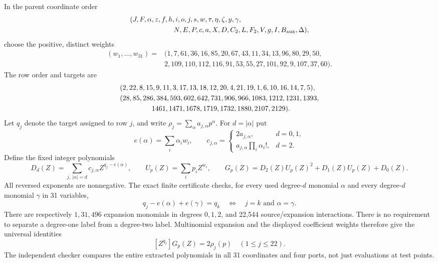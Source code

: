 In the parent coordinate order
\[
\begin{split}
 &(J,F,\alpha,z,f,h,i,o,j,s,w,\tau,\eta,\zeta,y,\gamma,\\
 &\hspace{22mm}N,E,P,c,a,X,D,C_2,L,F_2,V,g,I,B_{\rm aux},\Delta),
\end{split}
\]
choose the positive, distinct weights
\[
\begin{split}
 (w_1,\ldots,w_{31})={}&(1,7,61,36,16,85,20,67,43,11,34,13,96,80,29,50,\\
 &2,109,110,112,116,91,53,55,27,101,92,9,107,37,60).
\end{split}
\]
The row order and targets are
\[
\begin{split}
 &(2,22,8,15,9,11,3,17,13,18,12,20,4,21,19,1,6,10,16,14,7,5),\\
 &(28,85,286,384,593,602,642,731,906,966,1083,1212,1231,1393,\\
 &\hspace{16mm}1461,1471,1678,1719,1732,1880,2107,2129).
\end{split}
\]
Let $q_j$ denote the target assigned to row $j$, and write
$\rho_j=\sum_\alpha a_{j,\alpha}p^\alpha$. For $d=|\alpha|$ put
\[
 e(\alpha)=\sum_i\alpha_iw_i,\qquad
 c_{j,\alpha}=
 \begin{cases}2a_{j,\alpha},&d=0,1,\\
 a_{j,\alpha}\prod_i\alpha_i!,&d=2.
 \end{cases}
\]
Define the fixed integer polynomials
\[
 D_d(Z)=\sum_{j,\,|\alpha|=d}c_{j,\alpha}Z^{q_j-e(\alpha)},\qquad
 U_p(Z)=\sum_i p_iZ^{w_i},\qquad
 G_p(Z)=D_2(Z)U_p(Z)^2+D_1(Z)U_p(Z)+D_0(Z).
\]
All reversed exponents are nonnegative. The exact finite certificate checks,
for every used degree-$d$ monomial $\alpha$ and every degree-$d$ monomial
$\gamma$ in 31 variables,
\[
 q_j-e(\alpha)+e(\gamma)=q_k
 \quad\Longleftrightarrow\quad j=k\text{ and }\alpha=\gamma.
\]
There are respectively $1,31,496$ expansion monomials in degrees $0,1,2$,
and 22,544 source/expansion interactions. There is no requirement to
separate a degree-one label from a degree-two label. Multinomial expansion
and the displayed coefficient weights therefore give the universal identities
\begin{equation}\label{eq:split-extraction}
 [Z^{q_j}]G_p(Z)=2\rho_j(p)\quad(1\le j\le22).
\end{equation}
The independent checker compares the entire extracted polynomials in all
31 coordinates and four ports, not just evaluations at test points.

